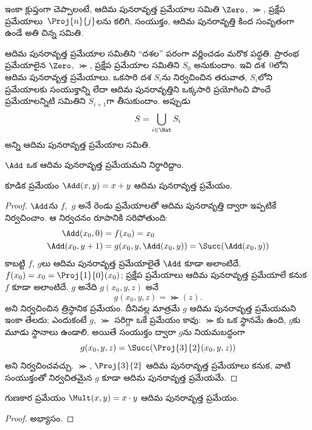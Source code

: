 \documentclass[../../../include/open-logic-section]{subfiles}
\begin{document}
\begin{explain}
ఇంకా క్లుప్తంగా చెప్పాలంటే, ఆదిమ పునరావృత్త ప్రమేయాల సమితి
$\Zero$, $\Succ$, ప్రక్షేప ప్రమేయాలు~$\Proj{n}{j}$లను కలిగి,
సంయుక్తం, ఆదిమ పునరావృత్తి కింద సంవృతంగా ఉండే అతి చిన్న సమితి.

ఆదిమ పునరావృత్త ప్రమేయాల సమితిని ``దశల'' పరంగా వర్ణించడం మరొక
పద్ధతి. ప్రారంభ ప్రమేయాలైన $\Zero$, $\Succ$, ప్రక్షేప ప్రమేయాల సమితిని
$S_0$ అనుకుందాం. ఇవి దశ~$0$లోని ఆదిమ పునరావృత్త ప్రమేయాలు. ఒకసారి దశ
$S_i$ను నిర్వచించిన తరువాత, $S_i$లోని ప్రమేయాలకు సంయుక్తాన్ని
లేదా ఆదిమ పునరావృత్తిని ఒక్కసారి ప్రయోగించి పొందే ప్రమేయాలన్నిటి సమితిని
$S_{i+1}$గా తీసుకుందాం. అప్పుడు
\[
S = \bigcup_{i \in \Nat} S_i
\]
అన్ని ఆదిమ పునరావృత్త ప్రమేయాల సమితి.
\end{explain}

$\Add$ ఒక ఆదిమ పునరావృత్త ప్రమేయమని నిర్ధారిద్దాం.

\begin{prop}
  కూడిక ప్రమేయం $\Add(x,y)=x+y$ ఆదిమ పునరావృత్త ప్రమేయం.
\end{prop}

\begin{proof}
$\Add$ను $f$,~$g$ అనే రెండు ప్రమేయాలతో ఆదిమ పునరావృత్తి ద్వారా
ఇప్పటికే నిర్వచించాం. ఆ నిర్వచనం  రూపానికి
సరిపోతుంది:
\begin{align*}
  \Add(x_0, 0) & = f(x_0) = x_0\\
  \Add(x_0, y+1) & = g(x_0, y, \Add(x_0, y)) =
  \Succ(\Add(x_0, y))
\end{align*}
కాబట్టి $f$, $g$లు ఆదిమ పునరావృత్త ప్రమేయాలైతే $\Add$ కూడా అలాంటిదే.
$f(x_0)=x_0=\Proj{1}{0}(x_0)$; ప్రక్షేప ప్రమేయాలు ఆదిమ పునరావృత్త
ప్రమేయాలే కనుక $f$ కూడా అలాంటిదే. $g$ అనేది $g(x_0,y,z)$ అనే
\[
g(x_0, y, z) = \Succ(z).
\]
అని నిర్వచించిన త్రిస్థానిక ప్రమేయం. దీనివల్ల మాత్రమే $g$ ఆదిమ
పునరావృత్త ప్రమేయమని ఇంకా తేలదు; ఎందుకంటే $g$, $\Succ$ సరిగ్గా ఒకే
ప్రమేయం కావు: $\Succ$కు ఒక స్థానమే ఉంది, $g$కు మూడు స్థానాలు ఉండాలి. అయితే
సంయుక్తం ద్వారా $g$ను నియమబద్ధంగా
\[
g(x_0, y, z) = \Succ(\Proj{3}{2}(x_0, y, z))
\]
అని నిర్వచించవచ్చు. $\Succ$, $\Proj{3}{2}$ ఆదిమ పునరావృత్త
ప్రమేయాలు కనుక, వాటి సంయుక్తంతో నిర్వచితమైన $g$ కూడా ఆదిమ పునరావృత్త
ప్రమేయమే.
\end{proof}

\begin{prop}
  గుణకార ప్రమేయం $\Mult(x,y)=x\cdot y$ ఆదిమ పునరావృత్త ప్రమేయం.
\end{prop}

\begin{proof}
  అభ్యాసం.
\end{proof}
\end{document}
